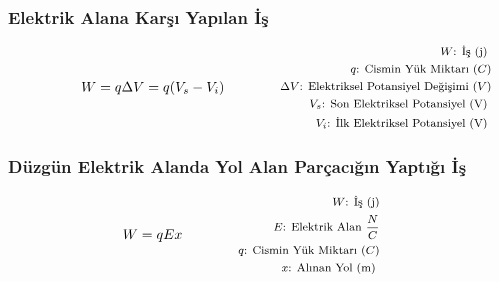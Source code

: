 \subsubsection*{Elektrik Alana Karşı Yapılan İş}
\begin{equation}
    W = q \Delta V = q (V_s - V_i) \qquad \qquad \parbox{4cm}{\footnotesize$\begin{aligned}
        W\text{: İş (j) } \\
        q\text{: Cismin Yük Miktarı } (C) \\
        \Delta V\text{: Elektriksel Potansiyel Değişimi } (V) \\
        V_s\text{: Son Elektriksel Potansiyel (V) } \\
        V_i\text{: İlk Elektriksel Potansiyel (V) }
\end{aligned}$}
\end{equation}

\subsubsection*{Düzgün Elektrik Alanda Yol Alan Parçacığın Yaptığı İş}
\begin{equation}
    W = q E x\qquad \qquad \parbox{4cm}{\footnotesize$\begin{aligned}
        W\text{: İş (j)} \\
        E\text{: Elektrik Alan } \frac{N}{C} \\
        q\text{: Cismin Yük Miktarı } (C) \\
        x\text{: Alınan Yol (m) }
\end{aligned}$}
\end{equation}
